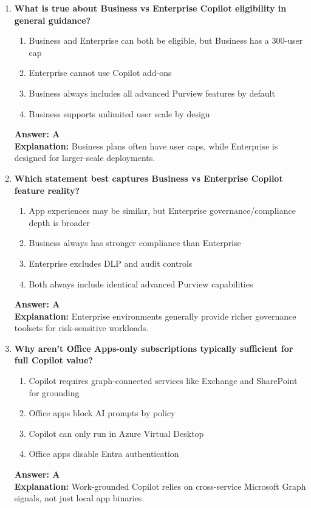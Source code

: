 \documentclass[10pt]{article}
\begin{document}
\begin{enumerate}[leftmargin=*]
\item \textbf{What is true about Business vs Enterprise Copilot eligibility in general guidance?}
\begin{enumerate}[label=\Alph*.]
  \item Business and Enterprise can both be eligible, but Business has a 300-user cap
  \item Enterprise cannot use Copilot add-ons
  \item Business always includes all advanced Purview features by default
  \item Business supports unlimited user scale by design
\end{enumerate}
\textbf{Answer: A}\\
\textbf{Explanation:} Business plans often have user caps, while Enterprise is designed for larger-scale deployments.

\item \textbf{Which statement best captures Business vs Enterprise Copilot feature reality?}
\begin{enumerate}[label=\Alph*.]
  \item App experiences may be similar, but Enterprise governance/compliance depth is broader
  \item Business always has stronger compliance than Enterprise
  \item Enterprise excludes DLP and audit controls
  \item Both always include identical advanced Purview capabilities
\end{enumerate}
\textbf{Answer: A}\\
\textbf{Explanation:} Enterprise environments generally provide richer governance toolsets for risk-sensitive workloads.

\item \textbf{Why aren’t Office Apps-only subscriptions typically sufficient for full Copilot value?}
\begin{enumerate}[label=\Alph*.]
  \item Copilot requires graph-connected services like Exchange and SharePoint for grounding
  \item Office apps block AI prompts by policy
  \item Copilot can only run in Azure Virtual Desktop
  \item Office apps disable Entra authentication
\end{enumerate}
\textbf{Answer: A}\\
\textbf{Explanation:} Work-grounded Copilot relies on cross-service Microsoft Graph signals, not just local app binaries.


\end{enumerate}
\end{document}

